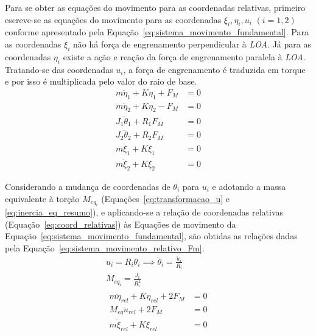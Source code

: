 Para se obter as equações do movimento para as coordenadas relativas, primeiro escreve-se as equações do movimento para as coordenadas $\xi_i, \eta_i, u_i$ $(i = 1, 2)$ conforme apresentado pela Equação~\ref{eq:sistema_movimento_fundamental}. Para as coordenadas $\xi_i$ não há força de engrenamento perpendicular à \textit{LOA}. Já para as coordenadas $\eta_i$ existe a ação e reação da força de engrenamento paralela à \textit{LOA}. Tratando-se das coordenadas $u_i$, a força de engrenamento é traduzida em torque e por isso é multiplicada pelo valor do raio de base.  
\begin{equation}
	\begin{aligned}
		m\ddot{\eta}_1 + K\eta_1 + F_M &= 0 \\
		m\ddot{\eta}_2 + K\eta_2 - F_M &= 0 \\
		J_1\ddot{\theta}_1 + R_1 F_M &= 0 \\
		J_2\ddot{\theta}_2 + R_2 F_M &= 0 \\
		m\ddot{\xi}_1 + K\xi_1 &= 0 \\
		m\ddot{\xi}_2 + K\xi_2 &= 0 
	\end{aligned}
	\label{eq:sistema_movimento_fundamental}
\end{equation}

Considerando a mudança de coordenadas de $\theta_i$ para $u_i$ e adotando a massa equivalente à torção $M_{eq_i}$ (Equações~\ref{eq:transformacao_u} e \ref{eq:inercia_eq_resumo}), e aplicando-se a relação de coordenadas relativas (Equação~\ref{eq:coord_relativas}) às Equações de movimento da Equação~\ref{eq:sistema_movimento_fundamental}, são obtidas as relações dadas pela Equação~\ref{eq:sistema_movimento_relativo_Fm}.
\begin{gather}
	u_i = R_i\theta_i \implies \ddot{\theta}_i = \frac{\ddot{u}_i}{R_i}
	\label{eq:transformacao_u}
\\
	M_{eq_i} = \frac{J_i}{R_i^2}
	\label{eq:inercia_eq_resumo}
\\
	\begin{aligned}
		m\ddot{\eta}_{rel} + K\eta_{rel} + 2F_M &= 0 \\
		M_{eq}\ddot{u}_{rel} + 2F_M &= 0 \\
		m\ddot{\xi}_{rel} + K\xi_{rel} &= 0
	\end{aligned}
	\label{eq:sistema_movimento_relativo_Fm}
\end{gather}

